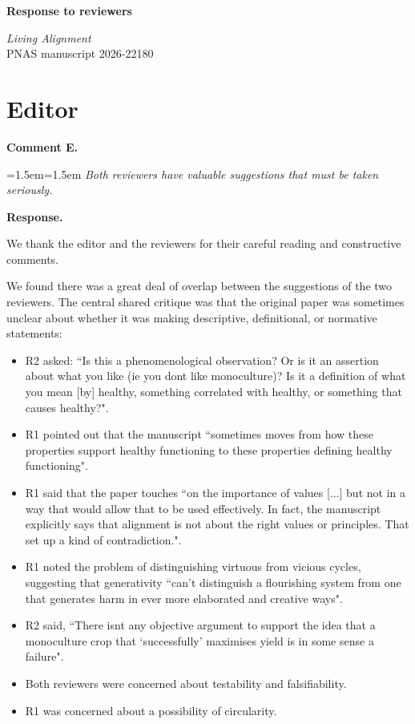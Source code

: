 \documentclass[fontsize=11.5pt]{scrartcl}
\newcounter{point}
\newcommand{\pointprefix}{}
\renewcommand{\thepoint}{\pointprefix.\arabic{point}}
\newcommand{\reviewersection}[2]{\section*{#1}\renewcommand{\pointprefix}{#2}\setcounter{point}{0}}
\newenvironment{reviewer}
  {\refstepcounter{point}\par\medskip
   \noindent\textbf{Comment \thepoint}\par
   \begingroup\leftskip=1.5em\rightskip=1.5em\itshape\color{reviewercolor}}
  {\par\endgroup\medskip\noindent\textbf{Response.}\ }
\begin{document}
\pagestyle{empty}

\begin{center}
{\Large\bfseries Response to reviewers}\par\medskip
\textit{Living Alignment}\\
PNAS manuscript 2026-22180
\end{center}

\vspace{1em}



\reviewersection{Editor}{E}

\begin{reviewer}
Both reviewers have valuable suggestions that must be taken seriously.
\end{reviewer}

We thank the editor and the reviewers for their careful reading and constructive comments. 

We found there was a great deal of overlap between the suggestions of the two reviewers. The central shared critique was that the original paper was sometimes unclear about whether it was making descriptive, definitional, or normative statements:
\begin{itemize}
  \item R2 asked: ``Is this a phenomenological observation? Or is it an assertion about what you like (ie you dont like monoculture)? Is it a definition of what you mean [by] healthy, something correlated with healthy, or something that causes healthy?". 
  \item R1 pointed out that the manuscript ``sometimes moves from how these properties support healthy functioning to these properties defining healthy functioning". 
  \item R1 said that the paper touches ``on the importance of values [...] but not in a way that would allow that to be used effectively. In fact, the manuscript explicitly says that alignment is not about the right values or principles. That set up a kind of contradiction.".
  \item R1 noted the problem of distinguishing virtuous from vicious cycles, suggesting that generativity ``can't distinguish a flourishing system from one that generates harm in ever more elaborated and creative ways". 
  \item R2 said, ``There isnt any objective argument to support the idea that a monoculture crop that `successfully' maximises yield is in some sense a failure".
  \item Both reviewers were concerned about testability and falsifiability.
  \item R1 was concerned about a possibility of circularity.
\end{itemize}
\end{document}
